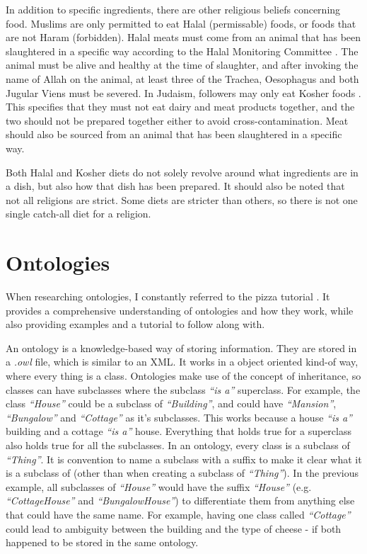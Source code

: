 In addition to specific ingredients, there are other religious beliefs concerning food. Muslims are only permitted to eat Halal (permissable) foods, or foods that are not Haram (forbidden). Halal meats must come from an animal that has been slaughtered in a specific way according to the Halal Monitoring Committee \cite{halal_monitoring_committee_2018}. The animal must be alive and healthy at the time of slaughter, and after invoking the name of Allah on the animal, at least three of the Trachea, Oesophagus and both Jugular Viens must be severed. In Judaism, followers may only eat Kosher foods \cite{kosher_2023}. This specifies that they must not eat dairy and meat products together, and the two should not be prepared together either to avoid cross-contamination. Meat should also be sourced from an animal that has been slaughtered in a specific way.

Both Halal and Kosher diets do not solely revolve around what ingredients are in a dish, but also how that dish has been prepared. It should also be noted that not all religions are strict. Some diets are stricter than others, so there is not one single catch-all diet for a religion.


\section{Ontologies}

When researching ontologies, I constantly referred to the pizza tutorial \cite{pizza_tutorial_site}. It provides a comprehensive understanding of ontologies and how they work, while also providing examples and a tutorial to follow along with.

An ontology is a knowledge-based way of storing information. They are stored in a \textit{.owl} file, which is similar to an XML. It works in a object oriented kind-of way, where every thing is a class. Ontologies make use of the concept of inheritance, so classes can have subclasses where the subclass \textit{``is a''} superclass. For example, the class \textit{``House''} could be a subclass of \textit{``Building''}, and could have \textit{``Mansion''}, \textit{``Bungalow''} and \textit{``Cottage''} as it's subclasses. This works because a house \textit{``is a''} building and a cottage \textit{``is a''} house. Everything that holds true for a superclass also holds true for all the subclasses. In an ontology, every class is a subclass of \textit{``Thing''}. It is convention to name a subclass with a suffix to make it clear what it is a subclass of (other than when creating a subclass of \textit{``Thing''}). In the previous example, all subclasses of \textit{``House''} would have the suffix \textit{``House''} (e.g. \textit{``CottageHouse''} and \textit{``BungalowHouse''}) to differentiate them from anything else that could have the same name. For example, having one class called \textit{``Cottage''} could lead to ambiguity between the building and the type of cheese - if both happened to be stored in the same ontology. 

